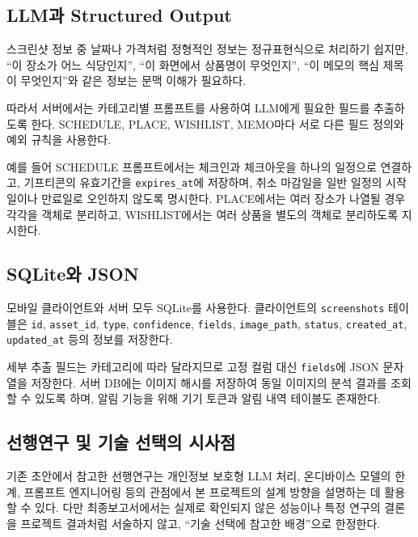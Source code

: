 \documentclass[11pt,a4paper]{article}
\begin{document}
\subsection{LLM과 Structured Output}

스크린샷 정보 중 날짜나 가격처럼 정형적인 정보는 정규표현식으로 처리하기 쉽지만, ``이 장소가 어느 식당인지'', ``이 화면에서 상품명이 무엇인지'', ``이 메모의 핵심 제목이 무엇인지''와 같은 정보는 문맥 이해가 필요하다.

따라서 서버에서는 카테고리별 프롬프트를 사용하여 LLM에게 필요한 필드를 추출하도록 한다. SCHEDULE, PLACE, WISHLIST, MEMO마다 서로 다른 필드 정의와 예외 규칙을 사용한다\cite{ref_prompt_engineering}.

예를 들어 SCHEDULE 프롬프트에서는 체크인과 체크아웃을 하나의 일정으로 연결하고, 기프티콘의 유효기간을 \texttt{expires\_at}에 저장하며, 취소 마감일을 일반 일정의 시작일이나 만료일로 오인하지 않도록 명시한다. PLACE에서는 여러 장소가 나열될 경우 각각을 객체로 분리하고, WISHLIST에서는 여러 상품을 별도의 객체로 분리하도록 지시한다.

\subsection{SQLite와 JSON}

모바일 클라이언트와 서버 모두 SQLite를 사용한다. 클라이언트의 \texttt{screenshots} 테이블은 \texttt{id}, \texttt{asset\_id}, \texttt{type}, \texttt{confidence}, \texttt{fields}, \texttt{image\_path}, \texttt{status}, \texttt{created\_at}, \texttt{updated\_at} 등의 정보를 저장한다.

세부 추출 필드는 카테고리에 따라 달라지므로 고정 컬럼 대신 \texttt{fields}에 JSON 문자열을 저장한다. 서버 DB에는 이미지 해시를 저장하여 동일 이미지의 분석 결과를 조회할 수 있도록 하며, 알림 기능을 위해 기기 토큰과 알림 내역 테이블도 존재한다.

\subsection{선행연구 및 기술 선택의 시사점}

기존 초안에서 참고한 선행연구는 개인정보 보호형 LLM 처리, 온디바이스 모델의 한계, 프롬프트 엔지니어링 등의 관점에서 본 프로젝트의 설계 방향을 설명하는 데 활용할 수 있다. 다만 최종보고서에서는 실제로 확인되지 않은 성능이나 특정 연구의 결론을 프로젝트 결과처럼 서술하지 않고, ``기술 선택에 참고한 배경''으로 한정한다.
\end{document}
